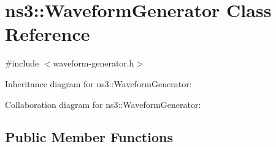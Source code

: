\hypertarget{classns3_1_1WaveformGenerator}{}\section{ns3\+:\+:Waveform\+Generator Class Reference}
\label{classns3_1_1WaveformGenerator}


{\ttfamily \#include $<$waveform-\/generator.\+h$>$}



Inheritance diagram for ns3\+:\+:Waveform\+Generator\+:


Collaboration diagram for ns3\+:\+:Waveform\+Generator\+:
\subsection*{Public Member Functions}
